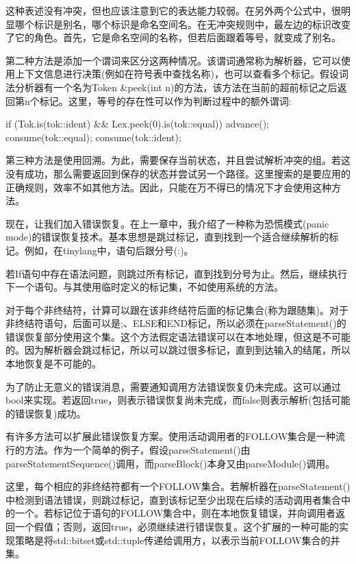 这种表述没有冲突，但也应该注意到它的表达能力较弱。在另外两个公式中，很明显哪个标识是别名，哪个标识是命名空间名。在无冲突规则中，最左边的标识改变了它的角色。首先，它是命名空间的名称，但若后面跟着等号，就变成了别名。

第二种方法是添加一个谓词来区分这两种情况。该谓词通常称为解析器，它可以使用上下文信息进行决策(例如在符号表中查找名称)，也可以查看多个标记。假设词法分析器有一个名为Token \&peek(int n)的方法，该方法在当前的超前标记之后返回第n个标记。这里，等号的存在性可以作为判断过程中的额外谓词:

\begin{cpp}
if (Tok.is(tok::ident) && Lex.peek(0).is(tok::equal)) {
    advance();
    consume(tok::equal);
}
consume(tok::ident);
\end{cpp}

第三种方法是使用回溯。为此，需要保存当前状态，并且尝试解析冲突的组。若这没有成功，那么需要返回到保存的状态并尝试另一个路径。这里搜索的是要应用的正确规则，效率不如其他方法。因此，只能在万不得已的情况下才会使用这种方法。

现在，让我们加入错误恢复。在上一章中，我介绍了一种称为恐慌模式(panic mode)的错误恢复技术。基本思想是跳过标记，直到找到一个适合继续解析的标记。例如，在tinylang中，语句后跟分号(:)。

若If语句中存在语法问题，则跳过所有标记，直到找到分号为止。然后，继续执行下一个语句。与其使用临时定义的标记集，不如使用系统的方法。

对于每个非终结符，计算可以跟在该非终结符后面的标记集合(称为跟随集)。对于非终结符语句，后面可以是;、ELSE和END标记，所以必须在parseStatement()的错误恢复部分使用这个集。这个方法假定语法错误可以在本地处理，但这是不可能的。因为解析器会跳过标记，所以可以跳过很多标记，直到到达输入的结尾，所以本地恢复是不可能的。

为了防止无意义的错误消息，需要通知调用方法错误恢复仍未完成。这可以通过bool来实现。若返回true，则表示错误恢复尚未完成，而false则表示解析(包括可能的错误恢复)成功。

有许多方法可以扩展此错误恢复方案。使用活动调用者的FOLLOW集合是一种流行的方法。作为一个简单的例子，假设parseStatement()由parseStatementSequence()调用，而parseBlock()本身又由parseModule()调用。

这里，每个相应的非终结符都有一个FOLLOW集合。若解析器在parseStatement()中检测到语法错误，则跳过标记，直到该标记至少出现在后续的活动调用者集合中的一个。若标记位于语句的FOLLOW集合中，则在本地恢复错误，并向调用者返回一个假值；否则，返回true，必须继续进行错误恢复。这个扩展的一种可能的实现策略是将std::bitset或std::tuple传递给调用方，以表示当前FOLLOW集合的并集。


